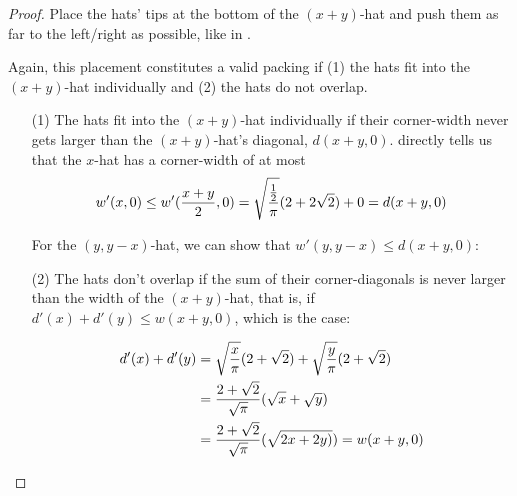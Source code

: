 \documentclass[%
    a4paper,              %
    style=print,          %
    bibliography=totoc,   %
    nexus,                %
    lnum,                 %
    extramargin,          %
]{tubsbook}
\begin{document}
\begin{proof}
    Place the hats' tips at the bottom of the $(x+y)$-hat and push them as far to the left/right as possible, like in .

    Again, this placement constitutes a valid packing if (1) the hats fit into the $(x+y)$-hat individually and (2) the hats do not overlap.
    \begin{itemize}
        \item[(1)]
            The hats fit into the $(x+y)$-hat individually if their corner-width never gets larger than the $(x+y)$-hat's diagonal, $d(x+y,0)$.
             directly tells us that the $x$-hat has a corner-width of at most
            \begin{align*}
                w'(x,0) \le w'(\frac{x+y}{2},0) = \sqrt{\frac{\frac{1}{2}}{\pi}}(2+2\sqrt{2}) + 0 = d(x+y,0)
            \end{align*}

            For the $(y,y-x)$-hat, we can show that $w'(y,y-x) \le d(x+y,0)$: 


        \item[(2)]
            The hats don't overlap if the sum of their corner-diagonals is never larger than the width of the $(x+y)$-hat, that is, if $d'(x) + d'(y) \le w(x+y,0)$, which is the case:

            \begin{align*}
                d'(x) + d'(y)
                &= \sqrt{\frac x \pi}(2+\sqrt{2}) + \sqrt{\frac{y}{\pi}}(2+\sqrt{2})\\
                &= \frac{2+\sqrt{2}}{\sqrt\pi}(\sqrt{x} + \sqrt{y})\\
                &= \frac{2+\sqrt{2}}{\sqrt\pi}(\sqrt{2x+2y)}) = w(x+y,0)
            \end{align*}
    \end{itemize}
\end{proof}
\end{document}
